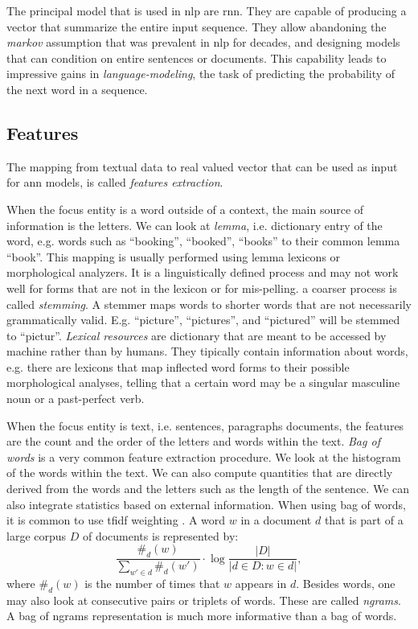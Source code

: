 The principal model that is used in \ac{nlp} are \ac{rnn}. They are
capable of producing a vector that summarize the entire input
sequence. They allow abandoning the \emph{markov} assumption that was
prevalent in \ac{nlp} for decades, and designing models that can
condition on entire sentences or documents. This capability leads to
impressive gains in \emph{language-modeling}, the task of predicting
the probability of the next word in a sequence.

\subsection{Features}
The mapping from textual data to real valued vector that can be used
as input for \ac{ann} models, is called \emph{features extraction}.

When the focus entity is a word outside of a context, the main source
of information is the letters. We can look at \emph{lemma},
i.e. dictionary entry of the word, e.g. words such as ``booking'',
``booked'', ``books'' to their common lemma ``book''. This mapping is
usually performed using lemma lexicons or morphological analyzers. It
is a linguistically defined process and may not work well for forms
that are not in the lexicon or for mis-pelling. a coarser process is
called \emph{stemming}. A stemmer maps words to shorter words that are
not necessarily grammatically valid. E.g. ``picture'', ``pictures'',
and ``pictured'' will be stemmed to ``pictur''. \emph{Lexical
  resources} are dictionary that are meant to be accessed by machine
rather than by humans. They tipically contain information about words,
e.g. there are lexicons that map inflected word forms to their
possible morphological analyses, telling that a certain word may be a
singular masculine noun or a past-perfect verb.

When the focus entity is text, i.e. sentences, paragraphs documents,
the features are the count and the order of the letters and words
within the text. \emph{Bag of words} is a very common feature
extraction procedure. We look at the histogram of the words within the
text. We can also compute quantities that are directly derived from
the words and the letters such as the length of the sentence. We can
also integrate statistics based on external information. When using
bag of words, it is common to use \ac{tfidf} weighting
\cite{manning_introduction_2008}. A word $w$ in a document $d$ that is
part of a large corpus $D$ of documents is represented by:
\begin{equation*}
  \frac{\#_d(w)}{\sum_{w'\in d}\#_d(w')}\cdot\log\frac{|D|}{|d\in
    D:w\in d|},
\end{equation*}
where $\#_d(w)$ is the number of times that $w$ appears in
$d$. Besides words, one may also look at consecutive pairs or triplets
of words. These are called \emph{ngrams}. A bag of ngrams
representation is much more informative than a bag of words.

